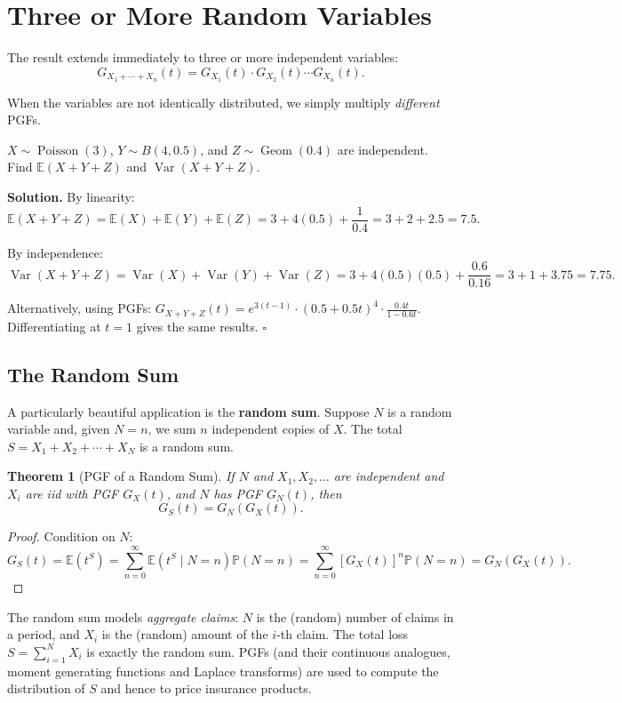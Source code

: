 \documentclass[12pt, a4paper, oneside]{book}
\theoremstyle{definition}
\theoremstyle{plain}
\newtheorem{theorem}{Theorem}[section]
\theoremstyle{remark}
\newcommand{\E}{\mathbb{E}}
\newcommand{\Var}{\operatorname{Var}}
\newcommand{\Prob}{\mathbb{P}}
\newenvironment{solution}
  {\par\medskip\noindent\textbf{Solution.}\quad}
  {\hfill$\square$\par\medskip}
\begin{document}
\section{Three or More Random Variables}
\label{sec:pgf-three}

The result extends immediately to three or more independent variables:
\[
  G_{X_1+\cdots+X_n}(t) = G_{X_1}(t)\cdot G_{X_2}(t)\cdots G_{X_n}(t).
\]

When the variables are not identically distributed, we simply multiply
\emph{different} PGFs.

\begin{workedexample}
$X\sim\operatorname{Poisson}(3)$, $Y\sim B(4,0.5)$, and $Z\sim\operatorname{Geom}(0.4)$
are independent.  Find $\E(X+Y+Z)$ and $\Var(X+Y+Z)$.

\begin{solution}
By linearity:
\[
  \E(X+Y+Z) = \E(X)+\E(Y)+\E(Z) = 3 + 4(0.5) + \frac{1}{0.4} = 3+2+2.5 = 7.5.
\]

By independence:
\[
  \Var(X+Y+Z) = \Var(X)+\Var(Y)+\Var(Z) = 3 + 4(0.5)(0.5) + \frac{0.6}{0.16}
  = 3 + 1 + 3.75 = 7.75.
\]

Alternatively, using PGFs:
$G_{X+Y+Z}(t) = e^{3(t-1)}\cdot(0.5+0.5t)^4\cdot\frac{0.4t}{1-0.6t}$.
Differentiating at $t=1$ gives the same results.
\end{solution}
\end{workedexample}

\subsection{The Random Sum}

A particularly beautiful application is the \textbf{random sum}.  Suppose
$N$ is a random variable and, given $N=n$, we sum $n$ independent copies
of $X$.  The total $S = X_1+X_2+\cdots+X_N$ is a random sum.

\begin{theorem}[PGF of a Random Sum]
If $N$ and $X_1,X_2,\ldots$ are independent and $X_i$ are iid with PGF
$G_X(t)$, and $N$ has PGF $G_N(t)$, then
\[
  G_S(t) = G_N(G_X(t)).
\]
\end{theorem}

\begin{proof}
Condition on $N$:
\[
  G_S(t) = \E(t^S) = \sum_{n=0}^\infty\E(t^S\mid N=n)\Prob(N=n)
  = \sum_{n=0}^\infty[G_X(t)]^n\Prob(N=n)
  = G_N(G_X(t)).
\]
\end{proof}

\begin{realworld}
The random sum models \emph{aggregate claims}: $N$ is the (random) number of
claims in a period, and $X_i$ is the (random) amount of the $i$-th claim.
The total loss $S=\sum_{i=1}^N X_i$ is exactly the random sum.  PGFs (and
their continuous analogues, moment generating functions and Laplace
transforms) are used to compute the distribution of $S$ and hence to
price insurance products.
\end{realworld}
\end{document}
